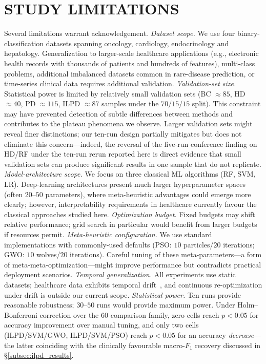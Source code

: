 \documentclass[letterpaper, 10 pt, conference]{ieeeconf}
\begin{document}
\section{STUDY LIMITATIONS}
\label{sec:limitations}

Several limitations warrant acknowledgement. \emph{Dataset scope.} We use four binary-classification datasets spanning oncology, cardiology, endocrinology and hepatology. Generalization to larger-scale healthcare applications (e.g., electronic health records with thousands of patients and hundreds of features), multi-class problems, additional imbalanced datasets common in rare-disease prediction, or time-series clinical data requires additional validation. \emph{Validation-set size.} Statistical power is limited by relatively small validation sets (BC $\approx 85$, HD $\approx 40$, PD $\approx 115$, ILPD $\approx 87$ samples under the $70$/$15$/$15$ split). This constraint may have prevented detection of subtle differences between methods and contributes to the plateau phenomena we observe. Larger validation sets might reveal finer distinctions; our ten-run design partially mitigates but does not eliminate this concern---indeed, the reversal of the five-run conference finding on HD/RF under the ten-run rerun reported here is direct evidence that small validation sets can produce significant results in one sample that do not replicate. \emph{Model-architecture scope.} We focus on three classical ML algorithms (RF, SVM, LR). Deep-learning architectures present much larger hyperparameter spaces (often $20$--$50$ parameters), where meta-heuristic advantages could emerge more clearly; however, interpretability requirements in healthcare currently favour the classical approaches studied here. \emph{Optimization budget.} Fixed budgets may shift relative performance; grid search in particular would benefit from larger budgets if resources permit. \emph{Meta-heuristic configuration.} We use standard implementations with commonly-used defaults (PSO: $10$ particles/$20$ iterations; GWO: $10$ wolves/$20$ iterations). Careful tuning of these meta-parameters---a form of meta-meta-optimization---might improve performance but contradicts practical deployment scenarios. \emph{Temporal generalization.} All experiments use static datasets; healthcare data exhibits temporal drift~\cite{gama2014}, and continuous re-optimization under drift is outside our current scope. \emph{Statistical power.} Ten runs provide reasonable robustness; $30$--$50$ runs would provide maximum power. Under Holm--Bonferroni correction over the $60$-comparison family, zero cells reach $p < 0.05$ for accuracy improvement over manual tuning, and only two cells (ILPD/SVM/GWO, ILPD/SVM/PSO) reach $p < 0.05$ for an accuracy \emph{decrease}---the latter coinciding with the clinically favourable macro-$F_1$ recovery discussed in \S\ref{subsec:ilpd_results}.
\end{document}
